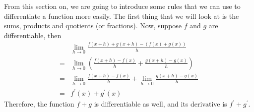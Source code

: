 From this section on, we are going to introduce some rules that we can use to differentiate a function more easily.
The first thing that we will look at is the sums, products and quotients (or fractions).
Now, suppose $f$ and $g$ are differentiable, then
\begin{align*}
    &\lim_{h\to0}\frac{f(x+h)+g(x+h)-(f(x)+g(x))}{h}\\
    =&\lim_{h\to0}(\frac{f(x+h)-f(x)}{h}+\frac{g(x+h)-g(x)}{h})\\
    =&\lim_{h\to0}\frac{f(x+h)-f(x)}{h}+\lim_{h\to0}\frac{g(x+h)-g(x)}{h}\\
    =&f^\prime(x)+g^\prime(x)
\end{align*}
Therefore, the function $f+g$ is differentiable as well, and its derivative is $f^\prime+g^\prime$.